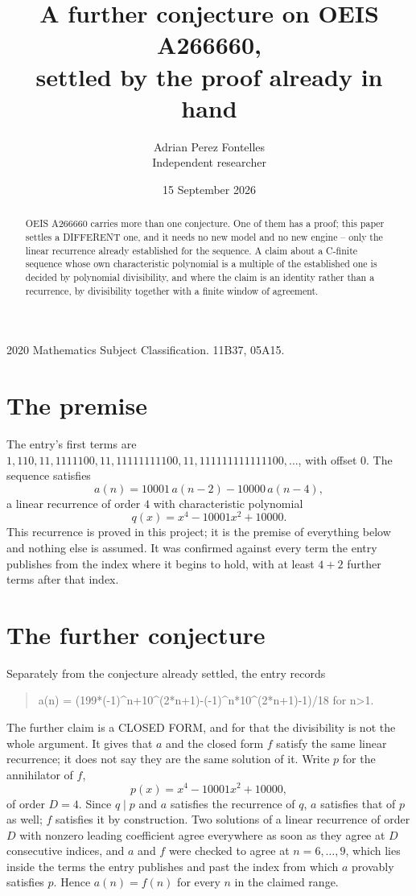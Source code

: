 \documentclass[11pt,a4paper]{article}
\title{A further conjecture on OEIS A266660,\\ \large settled by the proof already in hand}
\author{Adrian Perez Fontelles\\ \small Independent researcher}
\date{15 September 2026}
\theoremstyle{plain}
\theoremstyle{definition}
\begin{document}
\maketitle

\begin{abstract}
OEIS A266660 carries more than one conjecture. One of them has a proof; this paper settles a
DIFFERENT one, and it needs no new model and no new engine -- only the linear recurrence already
established for the sequence. A claim about a C-finite sequence whose own characteristic
polynomial is a multiple of the established one is decided by polynomial divisibility, and where
the claim is an identity rather than a recurrence, by divisibility together with a finite window
of agreement.
\end{abstract}

\noindent\small 2020 Mathematics Subject Classification. 11B37, 05A15.\normalsize

\section{The premise}

The entry's first terms are $1, 110, 11, 1111100, 11, 11111111100, 11, 111111111111100,\dots$, with offset $0$. The sequence satisfies
\[
  a(n)=10001\,a(n-2) - 10000\,a(n-4) ,
\]
a linear recurrence of order $4$ with characteristic polynomial
\[
  q(x)=x^{4} - 10001 x^{2} + 10000 .
\]
This recurrence is proved in this project; it is the premise of everything below and nothing else is assumed.
It was confirmed against every term the entry publishes from the index where it begins to hold,
with at least $4+2$ further terms after that index.

\section{The further conjecture}

Separately from the conjecture already settled, the entry records

\begin{quote}\raggedright a(n) = (199*(-1)\^{}n+10\^{}(2*n+1)-(-1)\^{}n*10\^{}(2*n+1)-1)/18 for n>1.\end{quote}

The further claim is a CLOSED FORM, and for that the divisibility is not the whole argument. It
gives that $a$ and the closed form $f$ satisfy the same linear recurrence; it does not say they
are the same solution of it. Write $p$ for the annihilator of $f$,
\[
  p(x)=x^{4} - 10001 x^{2} + 10000 ,
\]
of order $D=4$. Since $q\mid p$ and $a$ satisfies the recurrence of $q$, $a$ satisfies that of
$p$ as well; $f$ satisfies it by construction. Two solutions of a linear recurrence of order $D$
with nonzero leading coefficient agree everywhere as soon as they agree at $D$ consecutive
indices, and $a$ and $f$ were checked to agree at $n=6,\dots,9$,
which lies inside the terms the entry publishes and past the index from which $a$ provably
satisfies $p$. Hence $a(n)=f(n)$ for every $n$ in the claimed range.
\end{document}
